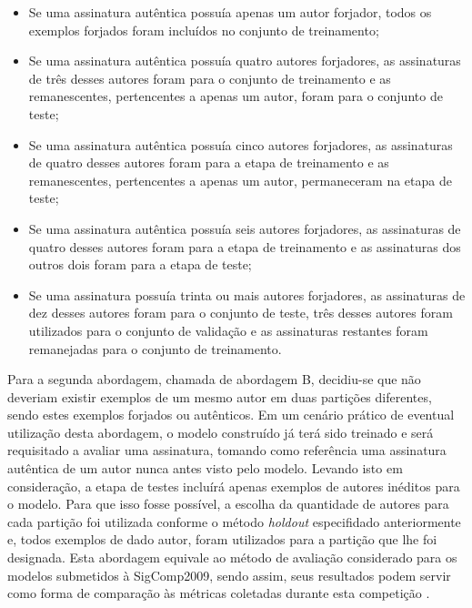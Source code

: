 
\begin{itemize}
	\item Se uma assinatura autêntica possuía apenas um autor forjador, todos os exemplos forjados foram incluídos no conjunto de treinamento;
	\item Se uma assinatura autêntica possuía quatro autores forjadores, as assinaturas de três desses autores foram para o conjunto de treinamento e as remanescentes, pertencentes a apenas um autor, foram para o conjunto de teste;
	\item Se uma assinatura autêntica possuía cinco autores forjadores, as assinaturas de quatro desses autores foram para a etapa de treinamento e as remanescentes, pertencentes a apenas um autor, permaneceram na etapa de teste;
	\item Se uma assinatura autêntica possuía seis autores forjadores, as assinaturas de quatro desses autores foram para a etapa de treinamento e as assinaturas dos outros dois foram para a etapa de teste;
	\item Se uma assinatura possuía trinta ou mais autores forjadores, as assinaturas de dez desses autores foram para o conjunto de teste, três desses autores foram utilizados para o conjunto de validação e as assinaturas restantes foram remanejadas para o conjunto de treinamento.
\end{itemize}

Para a segunda abordagem, chamada de abordagem B, decidiu-se que não deveriam existir exemplos de um mesmo autor em duas partições diferentes, sendo estes exemplos forjados ou autênticos. Em um cenário prático de eventual utilização desta abordagem, o modelo construído já terá sido treinado e será requisitado a avaliar uma assinatura, tomando como referência uma assinatura autêntica de um autor nunca antes visto pelo modelo. Levando isto em consideração, a etapa de testes incluírá apenas exemplos de autores inéditos para o modelo. Para que isso fosse possível, a escolha da quantidade de autores para cada partição foi utilizada conforme o método \emph{holdout} especifidado anteriormente e, todos exemplos de dado autor, foram utilizados para a partição que lhe foi designada. Esta abordagem equivale ao método de avaliação considerado para os modelos submetidos à SigComp2009, sendo assim, seus resultados podem servir como forma de comparação às métricas coletadas durante esta competição \cite{icdar2009}. 

